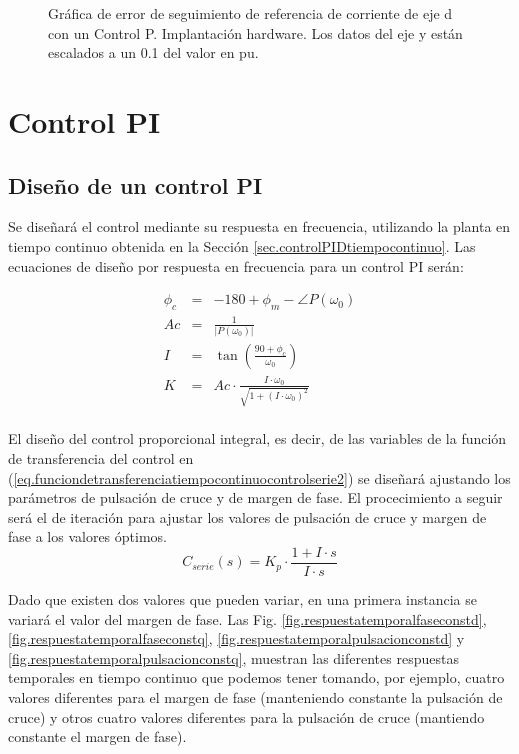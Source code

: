 \documentclass{report}
\begin{document}
\begin{figure}[!h]
    \centering
    \caption{Gráfica de error de seguimiento de referencia de corriente de eje d con un Control P. Implantación hardware. Los datos del eje y están escalados a un 0.1 del valor en pu.}
    \label{fig.excelcontrolP}
\end{figure} 
\clearpage

\section{Control PI}

\subsection{Diseño de un control PI} \label{sec.controlpi}

Se diseñará el control mediante su respuesta en frecuencia, utilizando la planta en tiempo continuo obtenida en la Sección \ref{sec.controlPIDtiempocontinuo}. Las ecuaciones de diseño por respuesta en frecuencia para un control PI serán:

\begin{eqnarray}
    \phi_{c} & = & -180 + \phi_{m} - \angle P(\omega_{0})\\ \label{eq.pulsacioncrucepi}
    Ac & = & \frac{1}{\left\lvert P (\omega_{0})\right\rvert }\\
    I & = & \tan (\frac{90+\phi_{c}}{\omega_0})\\
    K & = & Ac \cdot \frac{I \cdot \omega_{0}}{\sqrt{1+(I\cdot \omega_{0})^{2}}}\\
\end{eqnarray}

El diseño del control proporcional integral, es decir, de las variables de la función de transferencia del control en  (\ref{eq.funciondetransferenciatiempocontinuocontrolserie2}) se diseñará ajustando los parámetros de pulsación de cruce y de margen de fase. El procecimiento a seguir será el de iteración para ajustar los valores de pulsación de cruce y margen de fase a los valores óptimos.
\begin{equation}
    C_{serie}(s) = K_p \cdot  \frac{1+I\cdot s}{I\cdot s} \label{eq.funciondetransferenciatiempocontinuocontrolserie2}
\end{equation}

Dado que existen dos valores que pueden variar, en una primera instancia se variará el valor del margen de fase. Las Fig. \ref{fig.respuestatemporalfaseconstd}, \ref{fig.respuestatemporalfaseconstq}, \ref{fig.respuestatemporalpulsacionconstd} y \ref{fig.respuestatemporalpulsacionconstq}, muestran las diferentes respuestas temporales en tiempo continuo que podemos tener tomando, por ejemplo, cuatro valores diferentes para el margen de fase (manteniendo constante la pulsación de cruce) y otros cuatro valores diferentes para la pulsación de cruce (mantiendo constante el margen de fase).
\end{document}
